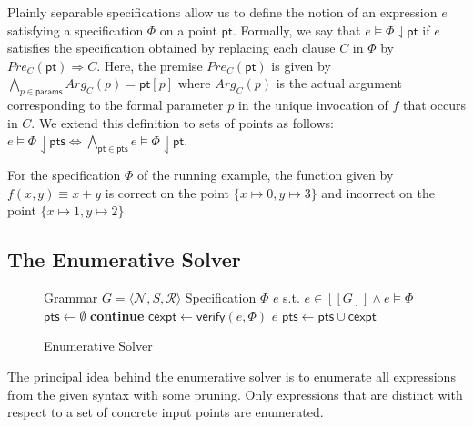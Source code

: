 \documentclass{llncs}
\newcommand\tuple[1]{\langle #1 \rangle}
\newcommand\Points{\mathsf{pts}}
\newcommand\Point{\mathsf{pt}}
\newcommand\Verify{\mathsf{verify}}
\newcommand\CexInput{\mathsf{cexpt}}
\newcommand\Expr{e}
\newcommand\Spec{\Phi}
\newcommand\Grammar{G}
\newcommand\sem[1]{[\![ #1 ]\!]}
\newcommand\SynthFun{f}
\newcommand\FormalParameters{\mathsf{params}}
\newcommand\NonTerminals{\mathcal{N}}
\newcommand\StartSymbol{S}
\newcommand\Rules{\mathcal{R}}
\begin{document}
Plainly separable specifications allow us to
define the notion of an expression $\Expr$ satisfying a specification
$\Spec$ on a point $\Point$.
Formally, we say that $\Expr \models \Spec \downharpoonleft
\Point$ if $\Expr$ satisfies the specification obtained by
replacing each clause $C$ in $\Spec$
by $\mathit{Pre}_C(\Point) \Rightarrow C$.
Here, the premise $\mathit{Pre}_C(\Point)$ is given by $\bigwedge_{p \in
\FormalParameters} \mathit{Arg}_C(p) = \Point[p]$ where
$\mathit{Arg}_C(p)$ is the actual argument corresponding to the formal
parameter $p$ in the unique invocation of $\SynthFun$ that occurs in $C$.
We extend this definition to sets of points as follows: $\Expr \models
\Spec \downharpoonleft \Points \Leftrightarrow \bigwedge_{\Point \in
\Points} \Expr \models \Spec\downharpoonleft\Point$.

\begin{example}
  \label{ex:running:correctness_on_point}
  For the specification $\Spec$ of the running example, the function
  given by $\SynthFun(x, y) \equiv x + y$ is correct on the point $\{ x
      \mapsto 0, y \mapsto 3 \}$ and incorrect on the point $\{ x
  \mapsto 1, y \mapsto 2 \}$
\end{example}

\subsection{The Enumerative Solver}
\label{sec:enumeration}

\begin{wrapfigure}{l}{0.46\textwidth}
  \begin{minipage}{0.46\textwidth}
    \begin{algorithm}[H]
      \begin{algorithmic}[1]
        \fontsize{8}{10}\selectfont
        \Require Grammar $\Grammar = \tuple { \NonTerminals, \StartSymbol, \Rules }$
        \Require Specification $\Spec$
        \Ensure $\Expr$ s.t.  $\Expr \in \sem{\Grammar} \wedge \Expr \models \Spec$
        \State $\Points \gets \emptyset$ \label{line:basic:init}
        \For {$\Expr \in \Call{enumerate}{\Grammar,\Points}$ }\label{line:basic:enumerate}
        \If { $\Expr \not\models \Spec \downharpoonleft  \Points$ } \textbf{continue} \EndIf\label{line:basic:concrete_check}
        \State $\CexInput \gets \Verify(\Expr, \Spec)$ \label{line:basic:verify}
        \If { $\CexInput = \bot$ } \Return $\Expr$ \EndIf \label{line:basic:return}
        \State $\Points \gets \Points \cup \CexInput$ \label{line:basic:continue}
        \EndFor
        \EndWhile
      \end{algorithmic}
      \caption{Enumerative Solver}
      \label{algo:basic}
    \end{algorithm}
  \end{minipage}
\end{wrapfigure}
The principal idea behind the enumerative solver is to enumerate all
expressions from the given syntax with some pruning.
Only expressions that are distinct with respect to a set of concrete
input points are enumerated.
\end{document}
